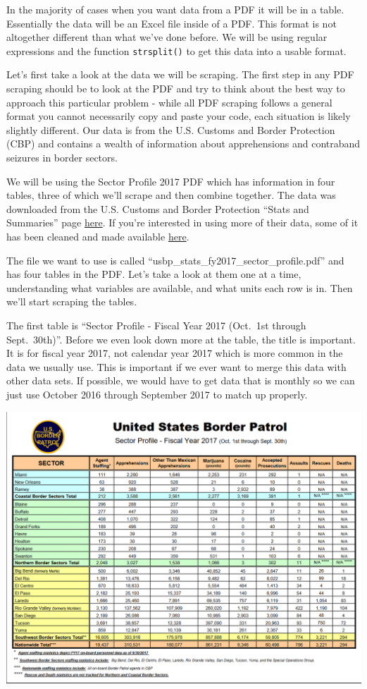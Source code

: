 \documentclass[
  12pt,
]{book}
\begin{document}
In the majority of cases when you want data from a PDF it will be in a table. Essentially the data will be an Excel file inside of a PDF. This format is not altogether different than what we've done before. We will be using regular expressions and the function \texttt{strsplit()} to get this data into a usable format.

Let's first take a look at the data we will be scraping. The first step in any PDF scraping should be to look at the PDF and try to think about the best way to approach this particular problem - while all PDF scraping follows a general format you cannot necessarily copy and paste your code, each situation is likely slightly different. Our data is from the U.S. Customs and Border Protection (CBP) and contains a wealth of information about apprehensions and contraband seizures in border sectors.

We will be using the Sector Profile 2017 PDF which has information in four tables, three of which we'll scrape and then combine together. The data was downloaded from the U.S. Customs and Border Protection ``Stats and Summaries'' page \href{https://www.cbp.gov/newsroom/media-resources/stats}{here}. If you're interested in using more of their data, some of it has been cleaned and made available \href{https://www.openicpsr.org/openicpsr/project/109522/version/V2/view}{here}.

The file we want to use is called ``usbp\_stats\_fy2017\_sector\_profile.pdf'' and has four tables in the PDF. Let's take a look at them one at a time, understanding what variables are available, and what units each row is in. Then we'll start scraping the tables.

The first table is ``Sector Profile - Fiscal Year 2017 (Oct.~1st through Sept.~30th)''. Before we even look down more at the table, the title is important. It is for fiscal year 2017, not calendar year 2017 which is more common in the data we usually use. This is important if we ever want to merge this data with other data sets. If possible, we would have to get data that is monthly so we can just use October 2016 through September 2017 to match up properly.

\includegraphics{images/pdf_table_1.PNG}
\end{document}
